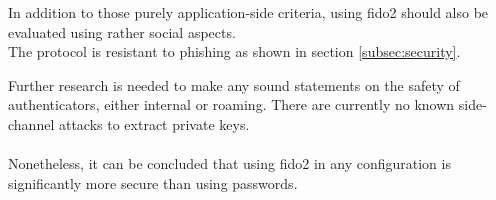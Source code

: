 
In addition to those purely application-side criteria, using \ac{fido2} should also be evaluated using rather social aspects.\\
The protocol is resistant to phishing as shown in section \ref{subsec:security}.

Further research is needed to make any sound statements on the safety of authenticators, either internal or roaming. There are currently no known side-channel attacks to extract private keys.\\
\\
Nonetheless, it can be concluded that using \ac{fido2} in any configuration is significantly more secure than using passwords.

